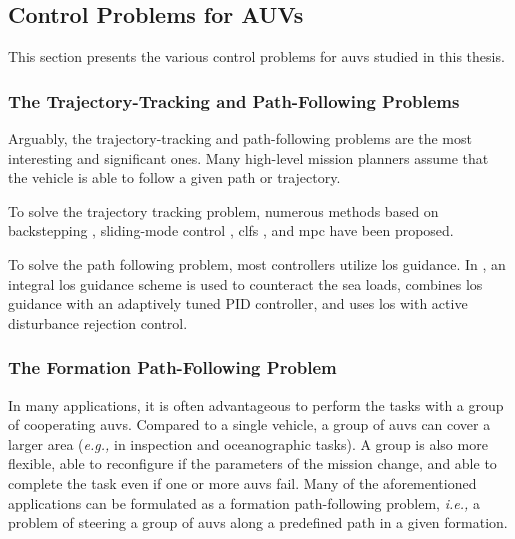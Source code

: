 \subsection{Control Problems for AUVs}

This section presents the various control problems for \glspl{auv} studied in this thesis.

\subsubsection{The Trajectory-Tracking and Path-Following Problems}

Arguably, the trajectory-tracking and path-following problems are the most interesting and significant ones.
Many high-level mission planners assume that the vehicle is able to follow a given path or trajectory.

To solve the trajectory tracking problem, numerous methods based on backstepping \cite{rezazadegan_trajectory-tracking-backstepping_2015,alonge_trajectory-tracking-backstepping_2001}, sliding-mode control \cite{elmokadem_trajectory-tracking-SMC_2016}, \glspl{clf} \cite{aguiar_trajectory-tracking-CLF_2007}, and \gls{mpc} \cite{abdelaal_trajectory-tracking-MPC_2015} have been proposed. 

To solve the path following problem, most controllers utilize \gls{los} guidance.
In \cite{caharija_path-following-ILOS_2016}, an integral \gls{los} guidance scheme is used to counteract the sea loads, \cite{xiang_path-following-robust_2017} combines \gls{los} guidance with an adaptively tuned PID controller, and \cite{miao_path-following-curvilinear_2017} uses \gls{los} with active disturbance rejection control.

\subsubsection{The Formation Path-Following Problem}

In many applications, it is often advantageous to perform the tasks with a group of cooperating \glspl{auv}.
Compared to a single vehicle, a group of \glspl{auv} can cover a larger area (\emph{e.g.,} in inspection and oceanographic tasks).
A group is also more flexible, able to reconfigure if the parameters of the mission change, and able to complete the task even if one or more \glspl{auv} fail.
Many of the aforementioned applications can be formulated as a formation path-following problem, \emph{i.e.,} a problem of steering a group of \glspl{auv} along a predefined path in a given formation.


